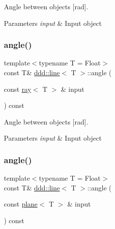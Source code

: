 Angle between objects \mbox{[}rad\mbox{]}. 


\begin{DoxyParams}{Parameters}
{\em input} & Input object \\
\hline
\end{DoxyParams}
\mbox{\label{classddd_1_1line_a0d122a300125cbce9b756ed55977c5eb}} 
\subsubsection{\texorpdfstring{angle()}{angle()}\hspace{0.1cm}{\footnotesize\ttfamily [3/5]}}
{\footnotesize\ttfamily template$<$typename T = Float$>$ \\
const T\& \hyperlink{classddd_1_1line}{ddd\+::line}$<$ T $>$\+::angle (\begin{DoxyParamCaption}\item[{const \hyperlink{classddd_1_1ray}{ray}$<$ T $>$ \&}]{input }\end{DoxyParamCaption}) const\hspace{0.3cm}{\ttfamily [inline]}}



Angle between objects \mbox{[}rad\mbox{]}. 


\begin{DoxyParams}{Parameters}
{\em input} & Input object \\
\hline
\end{DoxyParams}
\mbox{\label{classddd_1_1line_a3f7bf21d9f2338f9cc5538b6269ff603}} 
\subsubsection{\texorpdfstring{angle()}{angle()}\hspace{0.1cm}{\footnotesize\ttfamily [4/5]}}
{\footnotesize\ttfamily template$<$typename T = Float$>$ \\
const T\& \hyperlink{classddd_1_1line}{ddd\+::line}$<$ T $>$\+::angle (\begin{DoxyParamCaption}\item[{const \hyperlink{classddd_1_1plane}{plane}$<$ T $>$ \&}]{input }\end{DoxyParamCaption}) const\hspace{0.3cm}{\ttfamily [inline]}}



